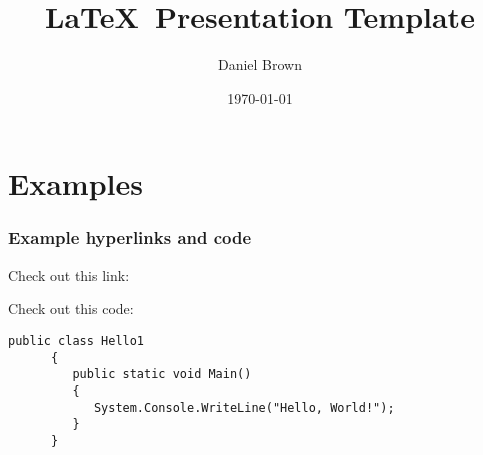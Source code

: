 \documentclass[aspectratio=169]{beamer}
\title[Presentation Template]{\LaTeX\ Presentation Template}
\author[DTB]{Daniel Brown}
\institute[UoY, CS]{The University of York, Department of Computer Science}
\date{\today}
\begin{document}
\frame{\titlepage}

\section{Examples} %
  \begin{frame}[containsverbatim]
    \frametitle{Example hyperlinks and code}
    Check out this link: \vspace{10 mm}

    Check out this code:
    \begin{lstlisting}[caption=Some C$^\sharp$ code in the presentation!, label=lst:test]
      public class Hello1
      {
         public static void Main()
         {
            System.Console.WriteLine("Hello, World!");
         }
      }
    \end{lstlisting}
  \end{frame}
\end{document}
